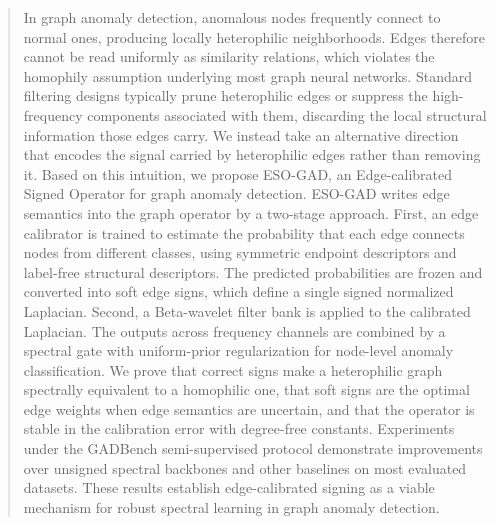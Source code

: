 \documentclass{article}
\theoremstyle{plain}
\theoremstyle{definition}
\theoremstyle{remark}
\begin{document}

\printAffiliationsAndNotice{}  %

\begin{abstract}
In graph anomaly detection, anomalous nodes frequently connect to normal ones, producing locally heterophilic neighborhoods. Edges therefore cannot be read uniformly as similarity relations, which violates the homophily assumption underlying most graph neural networks. Standard filtering designs typically prune heterophilic edges or suppress the high-frequency components associated with them, discarding the local structural information those edges carry. We instead take an alternative direction that encodes the signal carried by heterophilic edges rather than removing it. Based on this intuition, we propose ESO-GAD, an Edge-calibrated Signed Operator for graph anomaly detection. ESO-GAD writes edge semantics into the graph operator by a two-stage approach. First, an edge calibrator is trained to estimate the probability that each edge connects nodes from different classes, using symmetric endpoint descriptors and label-free structural descriptors. The predicted probabilities are frozen and converted into soft edge signs, which define a single signed normalized Laplacian. Second, a Beta-wavelet filter bank is applied to the calibrated Laplacian. The outputs across frequency channels are combined by a spectral gate with uniform-prior regularization for node-level anomaly classification. We prove that correct signs make a heterophilic graph spectrally equivalent to a homophilic one, that soft signs are the optimal edge weights when edge semantics are uncertain, and that the operator is stable in the calibration error with degree-free constants. Experiments under the GADBench semi-supervised protocol demonstrate improvements over unsigned spectral backbones and other baselines on most evaluated datasets. These results establish edge-calibrated signing as a viable mechanism for robust spectral learning in graph anomaly detection.
\end{abstract}
\end{document}
